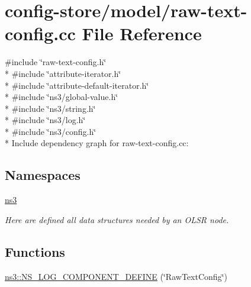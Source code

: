 \hypertarget{raw-text-config_8cc}{}\section{config-\/store/model/raw-\/text-\/config.cc File Reference}
\label{raw-text-config_8cc}
{\ttfamily \#include \char`\"{}raw-\/text-\/config.\+h\char`\"{}}\\*
{\ttfamily \#include \char`\"{}attribute-\/iterator.\+h\char`\"{}}\\*
{\ttfamily \#include \char`\"{}attribute-\/default-\/iterator.\+h\char`\"{}}\\*
{\ttfamily \#include \char`\"{}ns3/global-\/value.\+h\char`\"{}}\\*
{\ttfamily \#include \char`\"{}ns3/string.\+h\char`\"{}}\\*
{\ttfamily \#include \char`\"{}ns3/log.\+h\char`\"{}}\\*
{\ttfamily \#include \char`\"{}ns3/config.\+h\char`\"{}}\\*
Include dependency graph for raw-\/text-\/config.cc\+:
\subsection*{Namespaces}
\begin{DoxyCompactItemize}
\item 
 \hyperlink{namespacens3}{ns3}
\begin{DoxyCompactList}\small\item\em Here are defined all data structures needed by an O\+L\+SR node. \end{DoxyCompactList}\end{DoxyCompactItemize}
\subsection*{Functions}
\begin{DoxyCompactItemize}
\item 
\hyperlink{namespacens3_ae5463c16064f68957aea45a1577826f6}{ns3\+::\+N\+S\+\_\+\+L\+O\+G\+\_\+\+C\+O\+M\+P\+O\+N\+E\+N\+T\+\_\+\+D\+E\+F\+I\+NE} (\char`\"{}Raw\+Text\+Config\char`\"{})
\end{DoxyCompactItemize}
